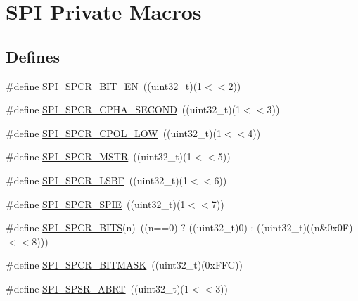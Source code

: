 \hypertarget{group___s_p_i___private___macros}{\section{\-S\-P\-I \-Private \-Macros}
\label{group___s_p_i___private___macros}
}
\subsection*{\-Defines}
\begin{DoxyCompactItemize}
\item 
\#define \hyperlink{group___s_p_i___private___macros_gae11f0ce596a73c17521fd9d4225bf86d}{\-S\-P\-I\-\_\-\-S\-P\-C\-R\-\_\-\-B\-I\-T\-\_\-\-E\-N}~((uint32\-\_\-t)(1$<$$<$2))
\item 
\#define \hyperlink{group___s_p_i___private___macros_gab5e1502a745213e5bcad2d51136d2d3d}{\-S\-P\-I\-\_\-\-S\-P\-C\-R\-\_\-\-C\-P\-H\-A\-\_\-\-S\-E\-C\-O\-N\-D}~((uint32\-\_\-t)(1$<$$<$3))
\item 
\#define \hyperlink{group___s_p_i___private___macros_gac75e5be8d424c68ffa2131d382e5fc78}{\-S\-P\-I\-\_\-\-S\-P\-C\-R\-\_\-\-C\-P\-O\-L\-\_\-\-L\-O\-W}~((uint32\-\_\-t)(1$<$$<$4))
\item 
\#define \hyperlink{group___s_p_i___private___macros_gad897a2f6e6f583df0c0c9d849e600104}{\-S\-P\-I\-\_\-\-S\-P\-C\-R\-\_\-\-M\-S\-T\-R}~((uint32\-\_\-t)(1$<$$<$5))
\item 
\#define \hyperlink{group___s_p_i___private___macros_ga30eac24047f9937f3e14e40aaabdf452}{\-S\-P\-I\-\_\-\-S\-P\-C\-R\-\_\-\-L\-S\-B\-F}~((uint32\-\_\-t)(1$<$$<$6))
\item 
\#define \hyperlink{group___s_p_i___private___macros_gad6a5a37bcd722f3e3f9c8b719835f54b}{\-S\-P\-I\-\_\-\-S\-P\-C\-R\-\_\-\-S\-P\-I\-E}~((uint32\-\_\-t)(1$<$$<$7))
\item 
\#define \hyperlink{group___s_p_i___private___macros_ga24fe6db67d8121019a10f9bebfc057db}{\-S\-P\-I\-\_\-\-S\-P\-C\-R\-\_\-\-B\-I\-T\-S}(n)~((n==0) ? ((uint32\-\_\-t)0) \-: ((uint32\-\_\-t)((n\&0x0\-F)$<$$<$8)))
\item 
\#define \hyperlink{group___s_p_i___private___macros_gaf740382276307c20c53670919e0a1442}{\-S\-P\-I\-\_\-\-S\-P\-C\-R\-\_\-\-B\-I\-T\-M\-A\-S\-K}~((uint32\-\_\-t)(0x\-F\-F\-C))
\item 
\#define \hyperlink{group___s_p_i___private___macros_gaaf7712834ac27a14993051970e9efddf}{\-S\-P\-I\-\_\-\-S\-P\-S\-R\-\_\-\-A\-B\-R\-T}~((uint32\-\_\-t)(1$<$$<$3))

\end{DoxyCompactItemize}
